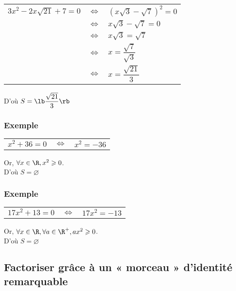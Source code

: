 \begin{tabular}{lll}
$3x^2 - 2x\sqrt{21} + 7 = 0$ & $\Longleftrightarrow$ & $\left(x\sqrt{3} - \sqrt{7}\right)^2 = 0 $ \\
& $\Longleftrightarrow$ & $x\sqrt{3} - \sqrt{7} = 0$ \\
& $\Longleftrightarrow$ & $x\sqrt{3} = \sqrt{7}$ \\
& $\Longleftrightarrow$ & $ x = \dfrac{\sqrt{7}}{\sqrt{3}}$ \\
& $\Longleftrightarrow$ & $x = \dfrac{\sqrt{21}}{3}$ \\
\end{tabular}

D'où $ S = \lb \dfrac{\sqrt{21}}{3} \rb $

\subsubsection{Exemple }

\begin{tabular}{lll}
$x^2 + 36 = 0$ & $\Longleftrightarrow$ & $x^2 = -36$ \\
\end{tabular}

\vspace*{.3cm} 

Or, $\forall x \in \R, x^2 \geqslant 0$. \\

D'où $ S = \varnothing$ 

\subsubsection{Exemple }

\begin{tabular}{lll}
$17x^2 + 13 = 0 $ & $\Longleftrightarrow$ & $ 17x^2 = -13$ \\
\end{tabular}

\vspace*{.3cm}

Or, $\forall x \in \R, \forall a \in \R^+, ax^2 \geqslant 0$. \\

D'où $ S = \varnothing $

\subsection{Factoriser grâce à un « morceau » d'identité remarquable}

